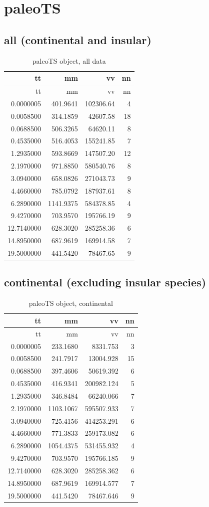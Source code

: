 \section{paleoTS}

\subsection*{all (continental and
	insular)}\label{all-continental-and-insularAP}

\begin{longtable}[]{@{}rrrr@{}}
	\caption{paleoTS object, all data}
	\label{tab:pTSall}\tabularnewline
	\toprule
	tt & mm & vv & nn\tabularnewline
	\midrule
	\endfirsthead
	\toprule
	tt & mm & vv & nn\tabularnewline
	\midrule
	\endhead
	0.0000005 & 401.9641 & 102306.64 & 4\tabularnewline
	0.0058500 & 314.1859 & 42607.58 & 18\tabularnewline
	0.0688500 & 506.3265 & 64620.11 & 8\tabularnewline
	0.4535000 & 516.4053 & 155241.85 & 7\tabularnewline
	1.2935000 & 593.8669 & 147507.20 & 12\tabularnewline
	2.1970000 & 971.8850 & 580540.76 & 8\tabularnewline
	3.0940000 & 658.0826 & 271043.73 & 9\tabularnewline
	4.4660000 & 785.0792 & 187937.61 & 8\tabularnewline
	6.2890000 & 1141.9375 & 584378.85 & 4\tabularnewline
	9.4270000 & 703.9570 & 195766.19 & 9\tabularnewline
	12.7140000 & 628.3020 & 285258.36 & 6\tabularnewline
	14.8950000 & 687.9619 & 169914.58 & 7\tabularnewline
	19.5000000 & 441.5420 & 78467.65 & 9\tabularnewline
	\bottomrule
\end{longtable}


\FloatBarrier

\subsection*{continental (excluding insular
	species)}\label{continental-excluding-insular-speciesAP}



\begin{longtable}[H]{@{}rrrr@{}}
	\caption{paleoTS object, continental}
	\label{tab:pTSC}\tabularnewline
	\toprule
	tt & mm & vv & nn\tabularnewline
	\midrule
	\endfirsthead
	\toprule
	tt & mm & vv & nn\tabularnewline
	\midrule
	\endhead
	0.0000005 & 233.1680 & 8331.753 & 3\tabularnewline
	0.0058500 & 241.7917 & 13004.928 & 15\tabularnewline
	0.0688500 & 397.4606 & 50619.392 & 6\tabularnewline
	0.4535000 & 416.9341 & 200982.124 & 5\tabularnewline
	1.2935000 & 346.8484 & 66240.066 & 7\tabularnewline
	2.1970000 & 1103.1067 & 595507.933 & 7\tabularnewline
	3.0940000 & 725.4156 & 414253.291 & 6\tabularnewline
	4.4660000 & 771.3833 & 259173.082 & 6\tabularnewline
	6.2890000 & 1054.4375 & 531455.932 & 4\tabularnewline
	9.4270000 & 703.9570 & 195766.185 & 9\tabularnewline
	12.7140000 & 628.3020 & 285258.362 & 6\tabularnewline
	14.8950000 & 687.9619 & 169914.577 & 7\tabularnewline
	19.5000000 & 441.5420 & 78467.646 & 9\tabularnewline
	\bottomrule
\end{longtable}


